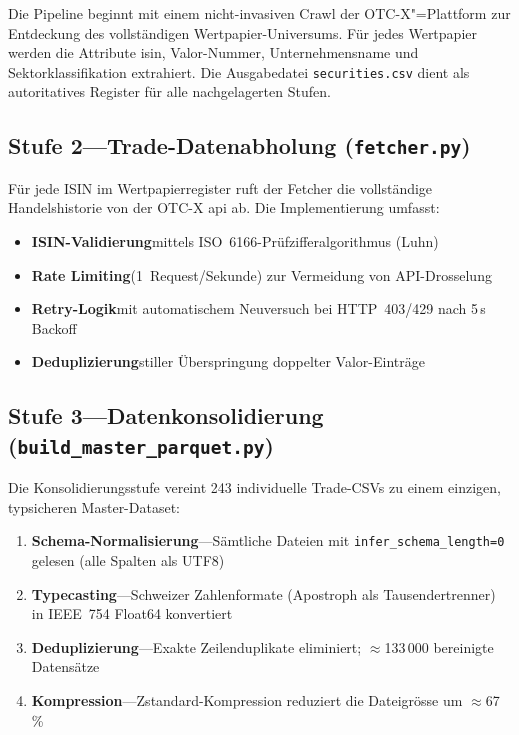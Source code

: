 \documentclass[11pt, a4paper, oneside, openany]{report}
\newcommand{\code}[1]{\texttt{\small\textcolor{DeepNavy}{#1}}}
\begin{document}
Die Pipeline beginnt mit einem nicht-invasiven Crawl der OTC-X"=Plattform zur Entdeckung des vollständigen Wertpapier-Universums. Für jedes Wertpapier werden die Attribute \gls{isin}, Valor-Nummer, Unternehmensname und Sektorklassifikation extrahiert. Die Ausgabedatei \code{securities.csv} dient als autoritatives Register für alle nachgelagerten Stufen.

\subsection{Stufe 2\;---\;Trade-Datenabholung (\code{fetcher.py})}

Für jede ISIN im Wertpapierregister ruft der Fetcher die vollständige Handelshistorie von der OTC-X \gls{api} ab. Die Implementierung umfasst:

\begin{itemize}
  \item \textbf{ISIN-Validierung}\;mittels ISO~6166-Prüfzifferalgorithmus (Luhn)
  \item \textbf{Rate Limiting}\;(1~Request/Sekunde) zur Vermeidung von API-Drosselung
  \item \textbf{Retry-Logik}\;mit automatischem Neuversuch bei HTTP~403/429 nach 5\,s Backoff
  \item \textbf{Deduplizierung}\;stiller Überspringung doppelter Valor-Einträge
\end{itemize}

\subsection{Stufe 3\;---\;Datenkonsolidierung (\code{build\_master\_parquet.py})}

Die Konsolidierungsstufe vereint 243 individuelle Trade-CSVs zu einem einzigen, typsicheren Master-Dataset:

\begin{enumerate}
  \item \textbf{Schema-Normalisierung}\;---\;Sämtliche Dateien mit \code{infer\_schema\_length=0} gelesen (alle Spalten als UTF8)
  \item \textbf{Typecasting}\;---\;Schweizer Zahlenformate (Apostroph als Tausendertrenner) in IEEE~754 Float64 konvertiert
  \item \textbf{Deduplizierung}\;---\;Exakte Zeilenduplikate eliminiert; $\approx$133\,000 bereinigte Datensätze
  \item \textbf{Kompression}\;---\;Zstandard-Kompression reduziert die Dateigrösse um $\approx$67\,\%
\end{enumerate}
\end{document}
